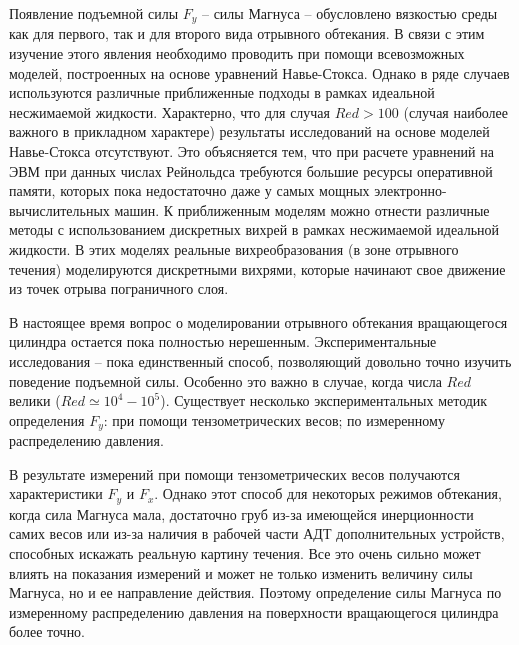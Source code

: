 \documentclass[specialist, subf, href, colorlinks=true, 14pt, final]{disser}
\theoremstyle{definition}
\begin{document}
Появление подъемной силы $F_y$ -- силы Магнуса -- обусловлено вязкостью среды как для первого, так и для второго вида отрывного обтекания. В связи с этим изучение этого явления необходимо проводить при помощи всевозможных моделей, построенных на основе уравнений Навье-Стокса. Однако в ряде случаев используются различные приближенные подходы в рамках идеальной несжимаемой жидкости. Характерно, что для случая $Red > 100$ (случая наиболее важного в прикладном характере) результаты исследований на основе моделей Навье-Стокса отсутствуют. Это объясняется тем, что при расчете уравнений на ЭВМ при данных числах Рейнольдса требуются большие ресурсы оперативной памяти, которых пока недостаточно даже у самых мощных электронно-вычислительных машин. К приближенным моделям можно отнести различные методы с использованием дискретных вихрей в рамках несжимаемой идеальной жидкости. В этих моделях реальные вихреобразования (в зоне отрывного течения) моделируются дискретными вихрями, которые начинают свое движение из точек отрыва пограничного слоя.

В настоящее время вопрос о моделировании отрывного обтекания вращающегося цилиндра остается пока полностью нерешенным. Экспериментальные исследования -- пока единственный способ, позволяющий довольно точно изучить поведение подъемной силы. Особенно это важно в случае, когда числа $Red$ велики ($Red \simeq 10^{4} - 10^{5}$). Существует несколько экспериментальных методик определения $F_y$: при помощи тензометрических весов; по измеренному распределению давления.

В результате измерений при помощи тензометрических весов получаются характеристики $F_y$ и $F_x$. Однако этот способ для некоторых режимов обтекания, когда сила Магнуса мала, достаточно груб из-за имеющейся инерционности самих весов или из-за наличия в рабочей части АДТ дополнительных устройств, способных искажать реальную картину течения. Все это очень сильно может влиять на показания измерений и может не только изменить величину силы Магнуса, но и ее направление действия. Поэтому определение силы Магнуса по измеренному распределению давления на поверхности вращающегося цилиндра более точно.
\end{document}
